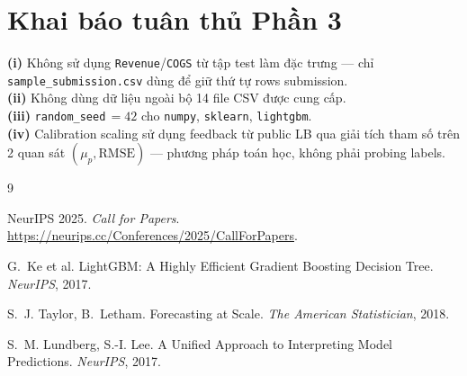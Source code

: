 \documentclass[10pt]{article}
\begin{document}
\section*{Khai báo tuân thủ Phần 3}

\textbf{(i)} Không sử dụng \texttt{Revenue}/\texttt{COGS} từ tập test làm đặc trưng --- chỉ \texttt{sample\_submission.csv} dùng để giữ thứ tự rows submission.\\
\textbf{(ii)} Không dùng dữ liệu ngoài bộ 14 file CSV được cung cấp.\\
\textbf{(iii)} \texttt{random\_seed}\,$=42$ cho \texttt{numpy}, \texttt{sklearn}, \texttt{lightgbm}.\\
\textbf{(iv)} Calibration scaling sử dụng feedback từ public LB qua giải tích tham số trên 2 quan sát $(\mu_p, \text{RMSE})$ --- phương pháp toán học, không phải probing labels.

\begin{thebibliography}{9}

NeurIPS 2025. \textit{Call for Papers}. \url{https://neurips.cc/Conferences/2025/CallForPapers}.

G.~Ke et al. LightGBM: A Highly Efficient Gradient Boosting Decision Tree.
\textit{NeurIPS}, 2017.

S.~J. Taylor, B.~Letham. Forecasting at Scale. \textit{The American Statistician}, 2018.

S.~M. Lundberg, S.-I. Lee. A Unified Approach to Interpreting Model Predictions.
\textit{NeurIPS}, 2017.

\end{thebibliography}
\end{document}
